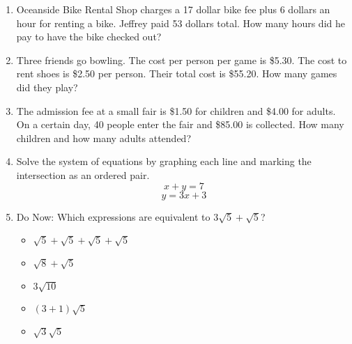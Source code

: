 \begin{enumerate}
     
  
  \newpage
    \item Oceanside Bike Rental Shop charges a 17 dollar bike fee plus 6 dollars an hour for renting a bike. Jeffrey paid 53 dollars total. How many hours did he pay to have the bike checked out? \vspace{6cm}
  
    \item Three friends go bowling. The cost per person per game is \$5.30. The cost to rent shoes is \$2.50 per person. Their total cost is \$55.20. How many games did they play? \vspace{6cm}
  
    \item The admission fee at a small fair is \$1.50 for children and \$4.00 for adults. On a certain day, 40 people enter the fair and \$85.00 is collected. How many children and how many adults attended?
  
\newpage
\item Solve the system of equations by graphing each line and marking the intersection as an ordered pair.
      \[x+y=7\]
      \[y=3x+3\]
  
  \begin{center} %
  \end{center}
  
  \item Do Now: Which expressions are equivalent to $3\sqrt{5}+\sqrt{5}$?
  \begin{itemize}[label=$\square$]
        \item $\sqrt{5}+\sqrt{5}+\sqrt{5}+\sqrt{5}$
        \item $\sqrt{8}+\sqrt{5}$
        \item $3\sqrt{10}$
        \item $(3+1)\sqrt{5}$
        \item $\sqrt{3} \sqrt{5}$
      \end{itemize}


\end{enumerate}
